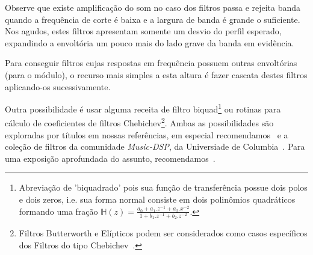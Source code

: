 \begin{itemize}
Observe que existe amplificação do som no caso dos filtros passa e rejeita banda quando a frequência
de corte é baixa e a largura de banda é grande o suficiente. Nos agudos, estes filtros apresentam
somente um desvio do perfil esperado, expandindo a envoltória um pouco mais do lado grave da banda em
evidência.

Para conseguir filtros cujas respostas em frequência possuem outras envoltórias (para o módulo),
o recurso mais simples a esta altura
é fazer cascata destes filtros aplicando-os sucessivamente.

Outra possibilidade é usar alguma receita de filtro
biquad\footnote{Abreviação
de 'biquadrado' pois sua função de transferência possue dois polos e dois zeros, i.e. sua
forma normal consiste em dois polinômios quadráticos formando uma fração
$\mathbb{H}(z)=\frac{a_0+a_1.z^{-1}+a_2.x^{-2}}{1+ b_1.z^{-1} +b_2 . z^{-2}}$.}
ou rotinas para cálculo de coeficientes
de filtros Chebichev\footnote{Filtros Butterworth e Elípticos podem
ser considerados como casos específicos dos Filtros do tipo Chebichev~\cite{Openheim,smith}.}.
Ambas as possibilidades são exploradas
por títulos em nossas referências, em especial recomendamos~\cite{JOSFM,smith} e a coleção de filtros da comunidade \emph{Music-DSP}, da Universiade de Columbia~\cite{music-dsp}.
Para uma exposição aprofundada do assunto, recomendamos~\cite{Openheim}.

\end{itemize}

